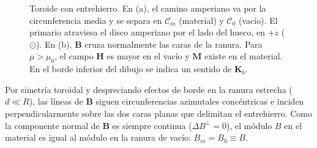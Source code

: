 \documentclass[11pt]{article}
\begin{document}
\begin{figure}[H]
\caption{Toroide con entrehierro. En (a), el camino amperiano va por
la circunferencia media y se separa en $\mathcal C_m$ (material) y
$\mathcal C_0$ (vacío). El primario atraviesa el disco amperiano por
el lado del hueco, en $+z$ ($\odot$). En (b), $\mathbf B$ cruza
normalmente las caras de la ranura. Para $\mu>\mu_0$, el campo
$\mathbf H$ es mayor en el vacío y $\mathbf M$ existe en el material.
En el borde inferior del dibujo se indica un sentido de $\mathbf K_b$.}
\label{fig:e2-toroide}
\end{figure}

Por simetría toroidal y despreciando efectos de borde en la ranura estrecha ($d \ll R$), las líneas de $\mathbf{B}$ siguen circunferencias azimutales concéntricas e inciden perpendicularmente sobre las dos caras planas que delimitan el entrehierro. Como la componente normal de $\mathbf{B}$ es siempre continua ($\Delta B^\perp = 0$), el módulo $B$ en el material es igual al módulo en la ranura de vacío: $B_m = B_0 \equiv B$.
\end{document}
